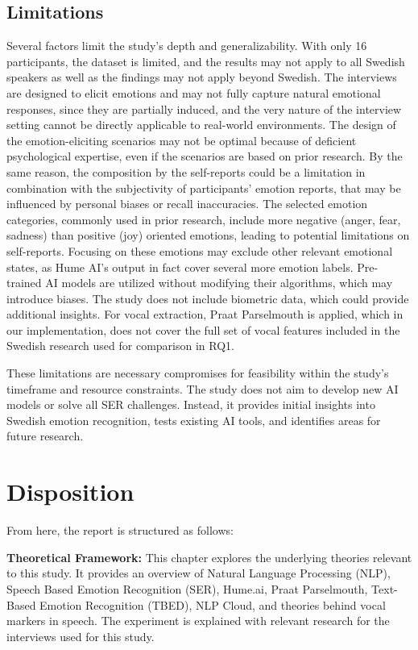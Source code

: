 \subsection{Limitations}
Several factors limit the study’s depth and generalizability. With only 16 participants, the dataset is limited, and the results may not apply to all Swedish speakers as well as the findings may not apply beyond Swedish. The interviews are designed to elicit emotions and may not fully capture natural emotional responses, since they are partially induced, and the very nature of the interview setting cannot be directly applicable to real-world environments. The design of the emotion-eliciting scenarios may not be optimal because of deficient psychological expertise, even if the scenarios are based on prior research. By the same reason, the composition by the self-reports could be a limitation in combination with the subjectivity of participants’ emotion reports, that may be influenced by personal biases or recall inaccuracies. The selected emotion categories, commonly used in prior research, include more negative (anger, fear, sadness) than positive (joy) oriented emotions, leading to potential limitations on self-reports. Focusing on these emotions may exclude other relevant emotional states, as Hume AI’s output in fact cover several more emotion labels. Pre-trained AI models are utilized without modifying their algorithms, which may introduce biases. The study does not include biometric data, which could provide additional insights. For vocal extraction, Praat Parselmouth is applied, which in our implementation, does not cover the full set of vocal features included in the Swedish research \autocite{Ekberg2023} used for comparison in RQ1. 

These limitations are necessary compromises for feasibility within the study’s timeframe and resource constraints. The study does not aim to develop new AI models or solve all SER challenges. Instead, it provides initial insights into Swedish emotion recognition, tests existing AI tools, and identifies areas for future research. 

\section{Disposition}
From here, the report is structured as follows: 

\textbf{Theoretical Framework:} This chapter explores the underlying theories relevant to this study. It provides an overview of Natural Language Processing (NLP), Speech Based Emotion Recognition (SER), Hume.ai, Praat Parselmouth, Text-Based Emotion Recognition (TBED), NLP Cloud, and theories behind vocal markers in speech. The experiment is explained with relevant research for the interviews used for this study. 

